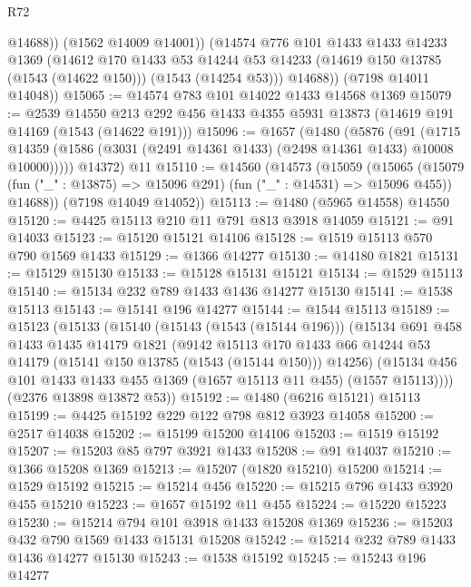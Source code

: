 \begin{lexlean}{R72}
\begin{coremodule}
              @14688))
          (@1562 @14009 @14001))
        (@14574
          @776
          @101
          @1433
          @1433
          @14233
          @1369
          (@14612
            @170
            @1433
            @53
            @14244
            @53
            @14233
            (@14619 @150 @13785 (@1543 (@14622 @150)))
            (@1543 (@14254 @53)))
          @14688))
      (@7198 @14011 @14048))
@15065 := @14574 @783 @101 @14022 @1433 @14568 @1369
@15079 := @2539
    @14550
    @213
    @292
    @456
    @1433
    @4355
    @5931
    @13873
    (@14619 @191 @14169 (@1543 (@14622 @191)))
@15096 := @1657
    (@1480
      (@5876
        (@91
          (@1715 @14359 (@1586 (@3031 (@2491 @14361 @1433) (@2498 @14361 @1433) @10008 @10000)))))
      @14372)
    @11
@15110 := @14560
    (@14573
      (@15059
        (@15065
          (@15079 (fun ("_" : @13875) => @15096 @291) (fun ("_" : @14531) => @15096 @455))
          @14688))
      (@7198 @14049 @14052))
@15113 := @1480 (@5965 @14558) @14550
@15120 := @4425 @15113 @210 @11 @791 @813 @3918 @14059
@15121 := @91 @14033
@15123 := @15120 @15121 @14106
@15128 := @1519 @15113 @570 @790 @1569 @1433
@15129 := @1366 @14277
@15130 := @14180 @1821
@15131 := @15129 @15130
@15133 := @15128 @15131 @15121
@15134 := @1529 @15113
@15140 := @15134 @232 @789 @1433 @1436 @14277 @15130
@15141 := @1538 @15113
@15143 := @15141 @196 @14277
@15144 := @1544 @15113
@15189 := @15123
    (@15133
      (@15140
        (@15143 (@1543 (@15144 @196)))
        (@15134
          @691
          @458
          @1433
          @1435
          @14179
          @1821
          (@9142
            @15113
            @170
            @1433
            @66
            @14244
            @53
            @14179
            (@15141 @150 @13785 (@1543 (@15144 @150)))
            @14256)
          (@15134 @456 @101 @1433 @1433 @455 @1369 (@1657 @15113 @11 @455) (@1557 @15113))))
      (@2376 @13898 @13872 @53))
@15192 := @1480 (@6216 @15121) @15113
@15199 := @4425 @15192 @229 @122 @798 @812 @3923 @14058
@15200 := @2517 @14038
@15202 := @15199 @15200 @14106
@15203 := @1519 @15192
@15207 := @15203 @85 @797 @3921 @1433
@15208 := @91 @14037
@15210 := @1366 @15208 @1369
@15213 := @15207 (@1820 @15210) @15200
@15214 := @1529 @15192
@15215 := @15214 @456
@15220 := @15215 @796 @1433 @3920 @455 @15210
@15223 := @1657 @15192 @11 @455
@15224 := @15220 @15223
@15230 := @15214 @794 @101 @3918 @1433 @15208 @1369
@15236 := @15203 @432 @790 @1569 @1433 @15131 @15208
@15242 := @15214 @232 @789 @1433 @1436 @14277 @15130
@15243 := @1538 @15192
@15245 := @15243 @196 @14277

\end{coremodule}
\end{lexlean}
